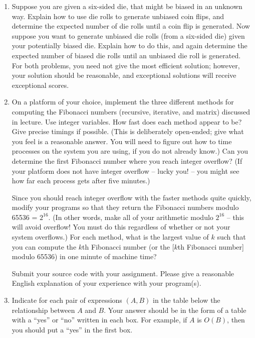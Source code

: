 \documentclass[11pt]{article}
\begin{document}
\begin{enumerate}

\item Suppose you are given a six-sided die, that might be biased in
an unknown way. Explain how to use die rolls to generate unbiased coin
flips, and determine the expected number of die rolls until a coin
flip is generated.  Now suppose you want to generate unbiased die
rolls (from a six-sided die) given your potentially biased die.
Explain how to do this, and again determine the expected number of
biased die rolls until an unbiased die roll is generated.  For both
problems, you need not give the most efficient solution; however, your
solution should be reasonable, and exceptional solutions will receive
exceptional scores.

\item On a platform of your choice, implement the three different
methods for computing the Fibonacci numbers (recursive, iterative, and
matrix) discussed in lecture.  Use integer variables.  How fast does
each method appear to be?  Give precise timings if possible.  (This is
deliberately open-ended; give what you feel is a reasonable answer.
You will need to figure out how to time processes on the system you
are using, if you do not already know.)  Can you determine the first
Fibonacci number where you reach integer overflow?  (If your platform
does not have integer overflow -- lucky you! -- you might see how far
each process gets after five minutes.)

Since you should reach integer overflow with the faster methods quite
quickly, modify your programs so that they return the Fibonacci
numbers modulo 65536 = $2^{16}$. (In other words, make all of your
arithmetic modulo $2^{16}$ -- this will avoid overflow!  You must do
this regardless of whether or not your system overflows.)  For each
method, what is the largest value of $k$ such that you can compute the $k$th Fibonacci number 
(or the [$k$th Fibonacci number] modulo 65536) in one minute of machine time?  

Submit your source code with your assignment.  Please give
a reasonable English explanation of your experience with your program(s).

\item Indicate for each pair of expressions $(A,B)$ in the table below
the relationship between $A$ and $B$.  Your answer should be in the
form of a table with a ``yes'' or ``no'' written in each box.  For
example, if $A$ is $O(B)$, then you should put a ``yes'' in the 
first box.


\end{enumerate}
\end{document}
